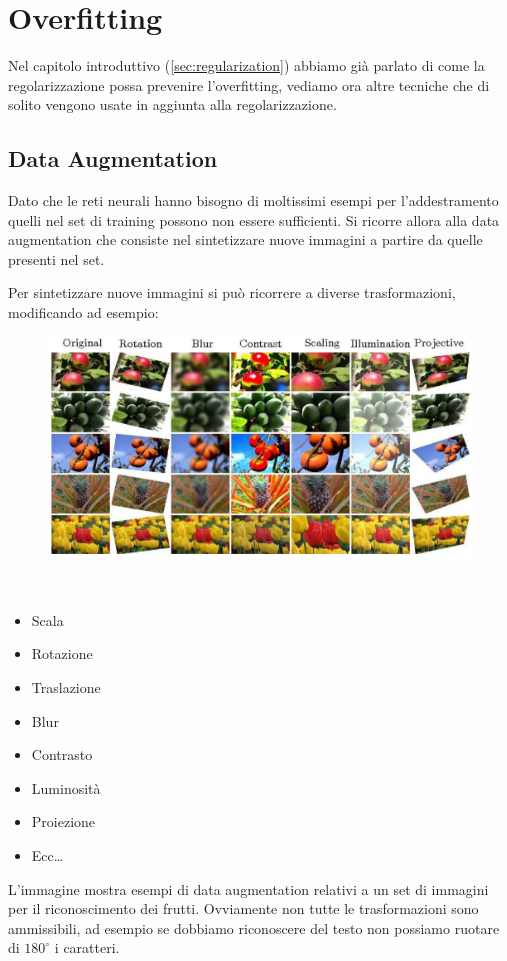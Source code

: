 \section{Overfitting}
Nel capitolo introduttivo (\ref{sec:regularization}) abbiamo già parlato di come la regolarizzazione possa prevenire l'overfitting, vediamo ora altre tecniche che di solito vengono usate in aggiunta alla regolarizzazione.

\subsection{Data Augmentation}
Dato che le reti neurali hanno bisogno di moltissimi esempi per l'addestramento quelli nel set di training possono non essere sufficienti. Si ricorre allora alla data augmentation che consiste nel sintetizzare nuove immagini a partire da quelle presenti nel set.

Per sintetizzare nuove immagini si può ricorrere a diverse trasformazioni, modificando ad esempio:

\begin{figure}
	\vspace{-.7cm}
	\centering
	\includegraphics[width=.9\linewidth]{Picture/Data_Augmentation}
\end{figure}
\ 
\vspace{-.5cm}
\begin{multicols}{2}
	\begin{itemize}
		\item Scala
		\item Rotazione
		\item Traslazione
		\item Blur
		\item Contrasto
		\item Luminosità
		\item Proiezione
		\item Ecc\dots
	\end{itemize}
\end{multicols}
\vspace{.5cm}
L'immagine mostra esempi di data augmentation relativi a un set di immagini per il riconoscimento dei frutti. Ovviamente non tutte le trasformazioni sono ammissibili, ad esempio se dobbiamo riconoscere del testo non possiamo ruotare di $180^{\circ}$ i caratteri.

